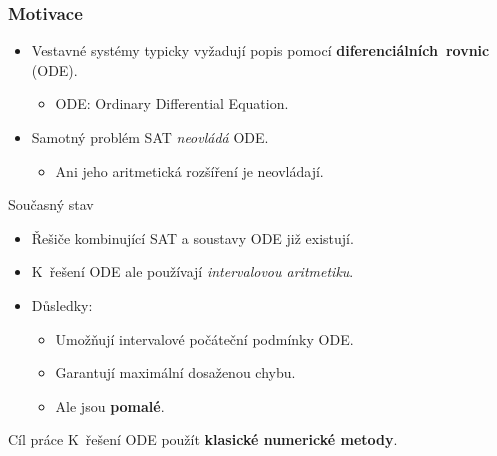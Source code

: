 \documentclass[t]{beamer}
\begin{document}
\begin{frame}\frametitle{Motivace}
\begin{itemize}
\item Vestavné systémy typicky vyžadují popis
   pomocí \textbf{diferenciálních~rovnic} (ODE).
   \begin{itemize}
   \item ODE: Ordinary Differential Equation.
   \end{itemize}
\item Samotný problém SAT \textit{neovládá} ODE.
   \begin{itemize}
   \item Ani jeho aritmetická rozšíření je neovládají.
   \end{itemize}
\end{itemize}

\begin{block}{Současný stav}
\begin{itemize}
\item Řešiče kombinující SAT a soustavy ODE již existují.
\item K~řešení ODE ale používají \textit{intervalovou aritmetiku}.
\item Důsledky:
   \begin{itemize}
   \item Umožňují intervalové počáteční podmínky ODE.
   \item Garantují maximální dosaženou chybu.
   \item Ale jsou \textbf{pomalé}.
   \end{itemize}
\end{itemize}
\end{block} %

\vfill

\begin{exampleblock}{Cíl práce}\centering
K~řešení ODE použít \textbf{klasické numerické metody}.
\end{exampleblock} %
\end{frame}

\end{document}
